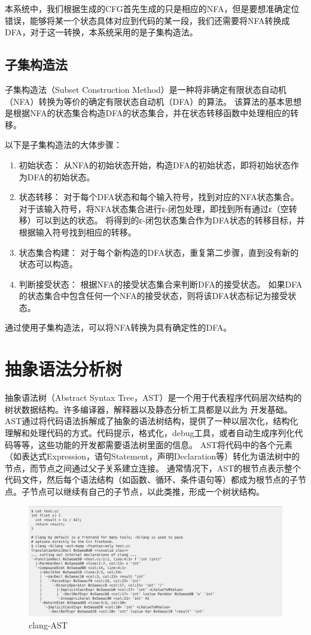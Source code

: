 本系统中，我们根据生成的CFG首先生成的只是相应的NFA，但是要想准确定位错误，能够将某一个状态具体对应到代码的某一段，我们还需要将NFA转换成
DFA，对于这一转换，本系统采用的是子集构造法。
\subsection{子集构造法}
子集构造法（Subset Construction Method）是一种将非确定有限状态自动机（NFA）转换为等价的确定有限状态自动机（DFA）的算法。
该算法的基本思想是根据NFA的状态集合构造DFA的状态集合，并在状态转移函数中处理相应的转移。

以下是子集构造法的大体步骤：
\begin{enumerate}
	\item  初始状态：
 从NFA的初始状态开始，构造DFA的初始状态，即将初始状态作为DFA的初始状态。
    \item  状态转移：
对于每个DFA状态和每个输入符号，找到对应的NFA状态集合。
对于该输入符号，将NFA状态集合进行ε-闭包处理，即找到所有通过ε（空转移）可以到达的状态。
将得到的ε-闭包状态集合作为DFA状态的转移目标，并根据输入符号找到相应的转移。
    \item  状态集合构建：
对于每个新构造的DFA状态，重复第二步骤，直到没有新的状态可以构造。
    \item  判断接受状态：
根据NFA的接受状态集合来判断DFA的接受状态。
如果DFA的状态集合中包含任何一个NFA的接受状态，则将该DFA状态标记为接受状态。
\end{enumerate}
通过使用子集构造法，可以将NFA转换为具有确定性的DFA。


\section{抽象语法分析树}
抽象语法树（Abstract Syntax Tree，AST）是一个用于代表程序代码层次结构的树状数据结构。许多编译器，解释器以及静态分析工具都是以此为
开发基础。AST通过将代码语法拆解成了抽象的语法树结构，提供了一种以层次化，结构化理解和处理代码的方式。代码提示，格式化，debug工具，或者自动生成序列化代码等等，这些功能的开发都需要语法树里面的信息。
AST将代码中的各个元素（如表达式Expression，语句Statement，声明Declaration等）转化为语法树中的节点，而节点之间通过父子关系建立连接。
通常情况下，AST的根节点表示整个代码文件，然后每个语法结构（如函数、循环、条件语句等）都成为根节点的子节点。子节点可以继续有自己的子节点，以此类推，形成一个树状结构。

\begin{figure}[htbp]
	\centering
	\includegraphics[width=1\textwidth]{pictures/clang-AST.png}
	\caption{clang-AST}
	\label{fig:my_label}
\end{figure}


